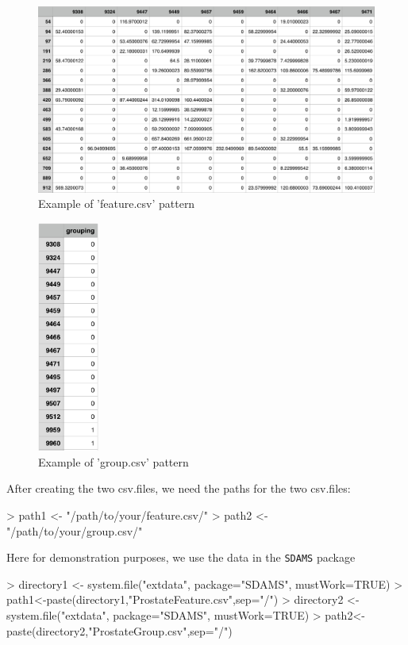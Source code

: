 \documentclass[12pt]{article}
\begin{document}
\begin{figure}[h!]
  \centering
  \includegraphics{feature.png}
  \caption{Example of 'feature.csv' pattern}
  \label{example feature}
\end{figure}
\begin{figure}[ht]
  \centering
  \includegraphics[width=2cm]{group.png}
  \caption{Example of 'group.csv' pattern}
  \label{example group}
\end{figure}


After creating the two csv.files, we need the paths for the two csv.files:

\begin{Schunk}
\begin{Sinput}
> path1 <- "/path/to/your/feature.csv/"
> path2 <- "/path/to/your/group.csv/"
\end{Sinput}
\end{Schunk}

Here for demonstration purposes, we use the data in the {\tt SDAMS} package

\begin{Schunk}
\begin{Sinput}
> directory1 <- system.file("extdata", package="SDAMS", mustWork=TRUE)
> path1<-paste(directory1,"ProstateFeature.csv",sep="/")
> directory2 <- system.file("extdata", package="SDAMS", mustWork=TRUE)
> path2<-paste(directory2,"ProstateGroup.csv",sep="/")
\end{Sinput}
\end{Schunk}
\end{document}
